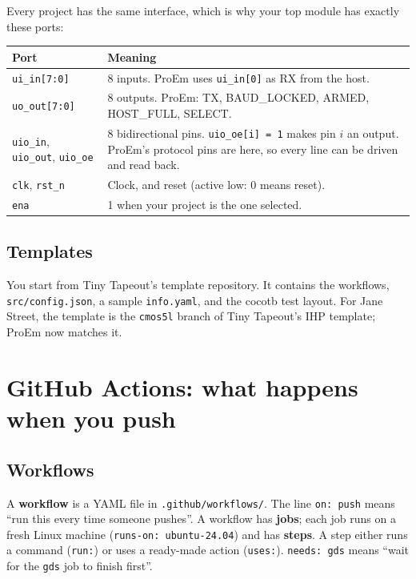 \documentclass[11pt,a4paper]{article}
\newcommand{\file}[1]{\texttt{#1}}
\begin{document}
Every project has the same interface, which is why your top module has exactly these ports:

\begin{center}
\begin{tabularx}{\linewidth}{@{}lX@{}}
\toprule
Port & Meaning \\
\midrule
\texttt{ui\_in[7:0]} & 8 inputs. ProEm uses \texttt{ui\_in[0]} as RX from the host. \\
\texttt{uo\_out[7:0]} & 8 outputs. ProEm: TX, BAUD\_LOCKED, ARMED, HOST\_FULL, SELECT. \\
\texttt{uio\_in}, \texttt{uio\_out}, \texttt{uio\_oe} & 8 bidirectional pins. \texttt{uio\_oe[i] = 1} makes pin $i$ an output. ProEm's protocol pins are here, so every line can be driven and read back. \\
\texttt{clk}, \texttt{rst\_n} & Clock, and reset (active low: 0 means reset). \\
\texttt{ena} & 1 when your project is the one selected. \\
\bottomrule
\end{tabularx}
\end{center}

\subsection{Templates}

You start from Tiny Tapeout's template repository. It contains the workflows, \file{src/config.json}, a sample \file{info.yaml}, and the cocotb test layout. For Jane Street, the template is the \texttt{cmos5l} branch of Tiny Tapeout's IHP template; ProEm now matches it.

\section{GitHub Actions: what happens when you push}\label{sec:actions}

\subsection{Workflows}

A \textbf{workflow} is a YAML file in \file{.github/workflows/}. The line \texttt{on: push} means ``run this every time someone pushes''. A workflow has \textbf{jobs}; each job runs on a fresh Linux machine (\texttt{runs-on: ubuntu-24.04}) and has \textbf{steps}. A step either runs a command (\texttt{run:}) or uses a ready-made action (\texttt{uses:}). \texttt{needs: gds} means ``wait for the \texttt{gds} job to finish first''.
\end{document}
